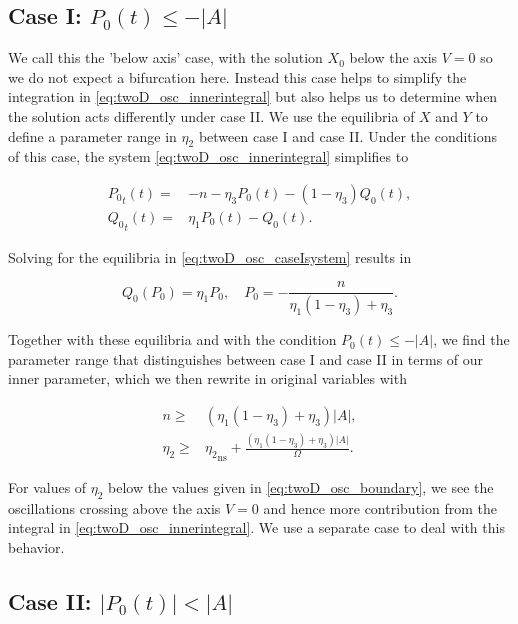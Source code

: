 \subsection{Case I: $P_0(t)\le -|A|$}
\label{subsec:twoD_highfreqosc_caseI}

We call this the 'below axis' case, with the solution $X_0$ below the axis $V=0$ so we do not expect a bifurcation here. Instead this case helps to simplify the integration in \eqref{eq:twoD_osc_innerintegral} but also helps us to determine when the solution acts differently under case II. We use the equilibria of $X$ and $Y$ to define a parameter range in $\eta_2$ between case I and case II. Under the conditions of this case, the system \eqref{eq:twoD_osc_innerintegral} simplifies to

\begin{equation}\label{eq:twoD_osc_caseIsystem}
\begin{aligned}
{P_0}_t(t) =& -n -\eta_3P_0(t)-(1-\eta_3)Q_0(t),\\
{Q_0}_t(t) =& \eta_1P_0(t)-Q_0(t).
\end{aligned}
\end{equation}

Solving for the equilibria in \eqref{eq:twoD_osc_caseIsystem} results in

\begin{equation*}
Q_0(P_0)=\eta_1P_0,\quad P_0=-\frac{n}{\eta_1(1-\eta_3)+\eta_3}. 
\end{equation*}

\indent Together with these equilibria and with the condition $P_0(t)\le -|A|$, we find the parameter range that distinguishes between case I and case II in terms of our inner parameter, which we then rewrite in original variables with

\begin{equation}\label{eq:twoD_osc_boundary}
\begin{aligned}
n\ge& (\eta_1(1-\eta_3)+\eta_3)|A|,\\
\eta_2\ge&{\eta_2}_{\text{ns}}+ \frac{(\eta_1(1-\eta_3)+\eta_3)|A|}{\Omega}.
\end{aligned}
\end{equation}

For values of $\eta_2$ below the values given in \eqref{eq:twoD_osc_boundary}, we see the oscillations crossing above the axis $V=0$ and hence more contribution from the integral in \eqref{eq:twoD_osc_innerintegral}. We use a separate case to deal with this behavior.

\subsection{Case II: $|P_0(t)|<|A|$}
\label{subsec:twoD_highfreqosc_caseII}

